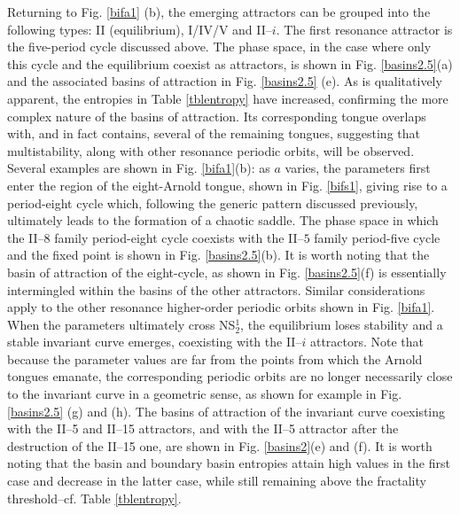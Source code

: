 \documentclass{article}
\theoremstyle{plain}
\theoremstyle{definition}
\begin{document}
Returning to Fig. \ref{bifa1} (b), the emerging attractors can be grouped into the following types: II (equilibrium), I/IV/V and II--$i$. The first resonance attractor is the five-period cycle discussed above. The phase space, in the case where only this cycle and the equilibrium coexist as attractors, is shown in Fig. \ref{basins2.5}(a) and the associated basins of attraction in Fig. \ref{basins2.5} (e). As is qualitatively apparent, the entropies in Table \ref{tblentropy} have increased, confirming the more complex nature of the basins of attraction. Its corresponding tongue overlaps with, and in fact contains, several of the remaining tongues, suggesting that multistability, along with other resonance periodic orbits, will be observed. Several examples are shown in Fig. \ref{bifa1}(b): as $a$ varies, the parameters first enter the region of the eight-Arnold tongue, shown in Fig. \ref{bifs1}, giving rise to a period-eight cycle which, following the generic pattern discussed previously, ultimately leads to the formation of a chaotic saddle. The phase space in which the II--$8$ family period-eight cycle coexists with the II--$5$ family period-five cycle and the fixed point is shown in Fig. \ref{basins2.5}(b). It is worth noting that the basin of attraction of the eight-cycle, as shown in Fig. \ref{basins2.5}(f) is essentially intermingled within the basins of the other attractors. Similar considerations apply to the other resonance higher-order periodic orbits shown in Fig. \ref{bifa1}. When the parameters ultimately cross NS$_{2}^1$, the equilibrium loses stability and a stable invariant curve emerges, coexisting with the II--$i$ attractors. Note that because the parameter values are far from the points from which the Arnold tongues emanate, the corresponding periodic orbits are no longer necessarily close to the invariant curve in a geometric sense, as shown for example in Fig. \ref{basins2.5} (g) and (h). The basins of attraction of the invariant curve coexisting with the II--5 and II--15 attractors, and with the II--5 attractor after the destruction of the II--15 one, are shown in Fig. \ref{basins2}(e) and (f). It is worth noting that the basin and boundary basin entropies attain high values in the first case and decrease in the latter case, while still remaining above the fractality threshold--cf. Table \ref{tblentropy}.
\end{document}
